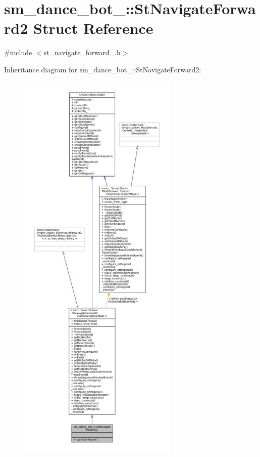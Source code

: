 \hypertarget{structsm__dance__bot__2_1_1StNavigateForward2}{}\section{sm\+\_\+dance\+\_\+bot\+\_\+:\+:St\+Navigate\+Forward2 Struct Reference}
\label{structsm__dance__bot__2_1_1StNavigateForward2}


{\ttfamily \#include $<$st\+\_\+navigate\+\_\+forward\+\_.\+h$>$}



Inheritance diagram for sm\+\_\+dance\+\_\+bot\+\_\+:\+:St\+Navigate\+Forward2\+:
\nopagebreak
\begin{figure}[H]
\begin{center}
\leavevmode
\includegraphics[height=550pt]{structsm__dance__bot__2_1_1StNavigateForward2__inherit__graph}
\end{center}
\end{figure}


